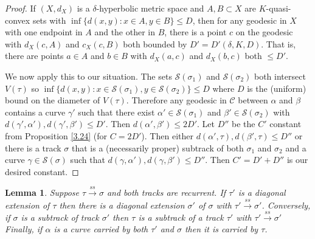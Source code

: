\documentclass[11pt]{article}
\newtheorem{lemma}[thm]{Lemma}
\theoremstyle{remark}
\def\S{{\mathcal S}}
\def\C{{\mathcal C}}
\def\ss{{\overset{ss}\longrightarrow}}
\begin{document}
\begin{proof}
If $(X,d_X)$ is a $\delta$-hyperbolic metric space and $A, B\subset X$ are $K$-quasi-convex sets with $\inf\{d(x,y):x\in A, y\in B\} \le D$, then for any geodesic in $X$ with one endpoint in $A$ and the other in $B$, there is a point $c$ on the geodesic with $d_X(c, A)$ and $c_X(c, B)$ both bounded by $D' = D'(\delta, K, D)$.
That is, there are points $a \in A$ and $b \in B$ with $d_X(a,c)$ and $d_X(b, c)$ both $\le D'$.

We now apply this to our situation. The sets $\S(\sigma_1)$ and $\S(\sigma_2)$  both intersect $V(\tau)$ so $\inf\{d(x,y): x\in \S(\sigma_1), y\in \S(\sigma_2)\} \le D$ where $D$ is the (uniform) bound on the diameter of $V(\tau)$.
Therefore any geodesic in $\C$ between $\alpha$ and $\beta$ contains a curve $\gamma'$ such that  there exist $\alpha' \in \S(\sigma_1)$ and $\beta' \in \S(\sigma_2)$ with $d(\gamma', \alpha'), d(\gamma', \beta')\le D'$. Then $d(\alpha', \beta') \le 2D'$. Let $D''$ be the $C'$ constant from Proposition \ref{3.24} (for $C = 2D'$).
 Then either $d(\alpha', \tau), d(\beta',\tau) \le D''$
or there is a track $\sigma$ that is a (necessarily proper) subtrack of both $\sigma_1$ and $\sigma_2$ and a curve $\gamma \in \S(\sigma)$ such that $d(\gamma, \alpha'), d(\gamma, \beta') \le D''$. Then $C' = D' + D''$ is our desired constant.
\end{proof}

\begin{lemma}\label{diagonal extension}
  Suppose $\tau\ss\sigma$ and both tracks are recurrent.
  If $\tau'$ is a diagonal
  extension of $\tau$ then there is a diagonal extension $\sigma'$ of
  $\sigma$ with $\tau'\ss\sigma'$.
  Conversely, if $\sigma$ is a subtrack of track $\sigma'$ then $\tau$ is a subtrack of a track $\tau'$ with $\tau'\ss\sigma'$
  Finally, if $\alpha$ is a curve carried by both $\tau'$
  and $\sigma$ then it is carried by $\tau$.
\end{lemma}
\end{document}
